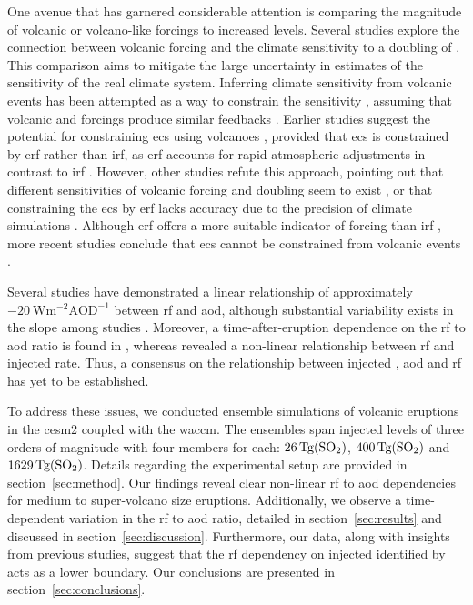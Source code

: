 \documentclass{ametsocV6.1}
\newcommand{\iso}[1][i]{{#1}njected \ce{SO2}}
\begin{document}
One avenue that has garnered considerable attention is comparing the magnitude of
volcanic or volcano-like forcings to increased  levels. Several studies explore
the connection between volcanic forcing and the climate sensitivity to a doubling of
\citep{boer2007,marvel2016,merlis2014,ollila2016,richardson2019,salvi2022,wigley2005}.
This comparison aims to mitigate the large uncertainty in estimates of the sensitivity
of the real climate system. Inferring climate sensitivity from volcanic events has been
attempted as a way to constrain the sensitivity \citep{boer2007}, assuming that volcanic
and  forcings produce similar feedbacks \citep{pauling2023}. Earlier studies
suggest the potential for constraining \gls{ecs} using volcanoes \citep{bender2010},
provided that \gls{ecs} is constrained by \gls{erf} rather than \gls{irf}, as \gls{erf}
accounts for rapid atmospheric adjustments in contrast to \gls{irf}
\citep{richardson2019}. However, other studies refute this approach, pointing out that
different sensitivities of volcanic forcing and  doubling seem to exist
\citep{douglass2006}, or that constraining the \gls{ecs} by \gls{erf} lacks accuracy due
to the precision of climate simulations \citep{boer2007,salvi2022}. Although \gls{erf}
offers a more suitable indicator of forcing than \gls{irf}
\citep{marvel2016,richardson2019}, more recent studies conclude that \gls{ecs} cannot be
constrained from volcanic events \citep{pauling2023}.

Several studies have demonstrated a linear relationship of approximately
\(-\SI{20}{\watt\metre^{-2}\mathrm{AOD}^{-1}}\) between \gls{rf} and \gls{aod}, although
substantial variability exists in the slope among studies
\citep{mills2017,hansen2005,gregory2016,marshall2020,pitari2016b}. Moreover, a
time-after-eruption dependence on the \gls{rf} to \gls{aod} ratio is found in
\citet{marshall2020}, whereas \citet{niemeier2015} revealed a non-linear relationship
between \gls{rf} and \iso{} rate. Thus, a consensus on the relationship between \iso{},
\gls{aod} and \gls{rf} has yet to be established.

To address these issues, we conducted ensemble simulations of volcanic eruptions in the
\gls{cesm2} coupled with the \gls{waccm}. The ensembles span \iso{} levels of three
orders of magnitude with four members for each: \(\SI{26}{\tera\gram(\ce{SO2})}\),
\(\SI{400}{\tera\gram(\ce{SO2})}\) and \(\SI{1629}{\tera\gram(\ce{SO2})}\). Details
regarding the experimental setup are provided in section~\ref{sec:method}. Our findings
reveal clear non-linear \gls{rf} to \gls{aod} dependencies for medium to super-volcano
size eruptions. Additionally, we observe a time-dependent variation in the \gls{rf} to
\gls{aod} ratio, detailed in section~\ref{sec:results} and discussed in
section~\ref{sec:discussion}. Furthermore, our data, along with insights from previous
studies, suggest that the \gls{rf} dependency on \iso{} identified by
\citet{niemeier2015} acts as a lower boundary. Our conclusions are presented in
section~\ref{sec:conclusions}.
\end{document}
